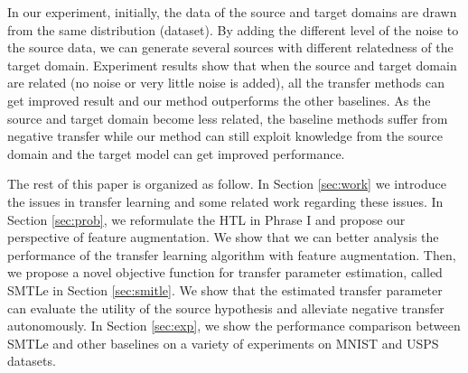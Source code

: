In our experiment, initially, the data of the source and target domains are drawn from the same distribution (dataset). By adding the different level of the noise to the source data, we can generate several sources with different relatedness of the target domain. Experiment results show that when the source and target domain are related (no noise or very little noise is added), all the transfer methods can get improved result and our method outperforms the other baselines. As the source and target domain become less related, the baseline methods suffer from negative transfer while our method can still exploit knowledge from the source domain and the target model can get improved performance. 

The rest of this paper is organized as follow. In Section \ref{sec:work} we introduce the issues in transfer learning and some related work regarding these issues.
In Section \ref{sec:prob}, we reformulate the HTL in Phrase I and propose our perspective of feature augmentation. We show that we can better analysis the performance of the transfer learning algorithm with feature augmentation. Then, we propose a novel objective function for transfer parameter estimation, called SMTLe in Section \ref{sec:smitle}. We show that the estimated transfer parameter can evaluate the utility of the source hypothesis and alleviate negative transfer autonomously. In Section \ref{sec:exp}, we show the performance comparison between SMTLe and other baselines on a variety of experiments on MNIST and USPS datasets.
